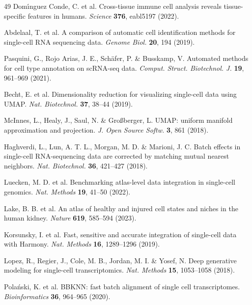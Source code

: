 \documentclass[11pt]{article}
\begin{document}
\begin{thebibliography}{49}
Dom\'{\i}nguez Conde, C. et al. Cross-tissue immune cell analysis reveals tissue-specific features in humans. \textit{Science} \textbf{376}, eabl5197 (2022).

Abdelaal, T. et al. A comparison of automatic cell identification methods for single-cell RNA sequencing data. \textit{Genome Biol.} \textbf{20}, 194 (2019).

Pasquini, G., Rojo Arias, J. E., Sch\"afer, P. \& Busskamp, V. Automated methods for cell type annotation on scRNA-seq data. \textit{Comput. Struct. Biotechnol. J.} \textbf{19}, 961--969 (2021).

Becht, E. et al. Dimensionality reduction for visualizing single-cell data using UMAP. \textit{Nat. Biotechnol.} \textbf{37}, 38--44 (2019).

McInnes, L., Healy, J., Saul, N. \& Gro\ss berger, L. UMAP: uniform manifold approximation and projection. \textit{J. Open Source Softw.} \textbf{3}, 861 (2018).

Haghverdi, L., Lun, A. T. L., Morgan, M. D. \& Marioni, J. C. Batch effects in single-cell RNA-sequencing data are corrected by matching mutual nearest neighbors. \textit{Nat. Biotechnol.} \textbf{36}, 421--427 (2018).

Luecken, M. D. et al. Benchmarking atlas-level data integration in single-cell genomics. \textit{Nat. Methods} \textbf{19}, 41--50 (2022).

Lake, B. B. et al. An atlas of healthy and injured cell states and niches in the human kidney. \textit{Nature} \textbf{619}, 585--594 (2023).

Korsunsky, I. et al. Fast, sensitive and accurate integration of single-cell data with Harmony. \textit{Nat. Methods} \textbf{16}, 1289--1296 (2019).

Lopez, R., Regier, J., Cole, M. B., Jordan, M. I. \& Yosef, N. Deep generative modeling for single-cell transcriptomics. \textit{Nat. Methods} \textbf{15}, 1053--1058 (2018).

Pola\'nski, K. et al. BBKNN: fast batch alignment of single cell transcriptomes. \textit{Bioinformatics} \textbf{36}, 964--965 (2020).


\end{thebibliography}
\end{document}

